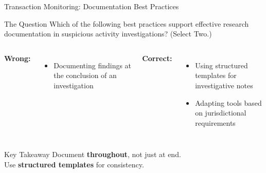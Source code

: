 \documentclass{beamer}
\begin{document}
\begin{frame}{Transaction Monitoring: Documentation Best Practices}
\begin{block}{The Question}
\small{Which of the following best practices support effective research documentation in suspicious activity investigations? (Select Two.)}
\end{block}

\begin{columns}
\textcolor{wrong}{\textbf{ Wrong:}}
\begin{itemize}
    \item Documenting findings at the conclusion of an investigation
\end{itemize}

\textcolor{correct}{\textbf{Correct:}}
\begin{itemize}
    \item Using structured templates for investigative notes
    \item Adapting tools based on jurisdictional requirements
\end{itemize}
\end{columns}

\vspace{0.3cm}
\begin{block}{Key Takeaway}
Document \textbf{throughout}, not just at end. \\
Use \textbf{structured templates} for consistency.
\end{block}
\end{frame}
\end{document}
